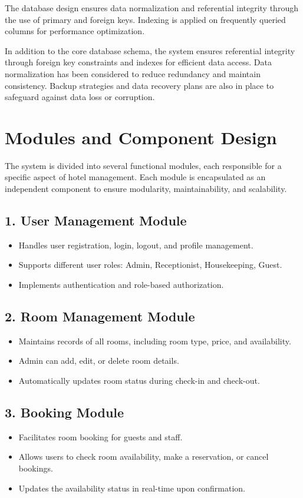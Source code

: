 \documentclass[a4paper,12pt]{article}
\begin{document}
The database design ensures data normalization and referential integrity through the use of primary and foreign keys. Indexing is applied on frequently queried columns for performance optimization.

In addition to the core database schema, the system ensures referential integrity through foreign key constraints and indexes for efficient data access. Data normalization has been considered to reduce redundancy and maintain consistency. Backup strategies and data recovery plans are also in place to safeguard against data loss or corruption.

\section{Modules and Component Design}

The system is divided into several functional modules, each responsible for a specific aspect of hotel management. Each module is encapsulated as an independent component to ensure modularity, maintainability, and scalability.

\subsection{1. User Management Module}
\begin{itemize}
    \item Handles user registration, login, logout, and profile management.
    \item Supports different user roles: Admin, Receptionist, Housekeeping, Guest.
    \item Implements authentication and role-based authorization.
\end{itemize}

\subsection{2. Room Management Module}
\begin{itemize}
    \item Maintains records of all rooms, including room type, price, and availability.
    \item Admin can add, edit, or delete room details.
    \item Automatically updates room status during check-in and check-out.
\end{itemize}

\subsection{3. Booking Module}
\begin{itemize}
    \item Facilitates room booking for guests and staff.
    \item Allows users to check room availability, make a reservation, or cancel bookings.
    \item Updates the availability status in real-time upon confirmation.
\end{itemize}
\end{document}
